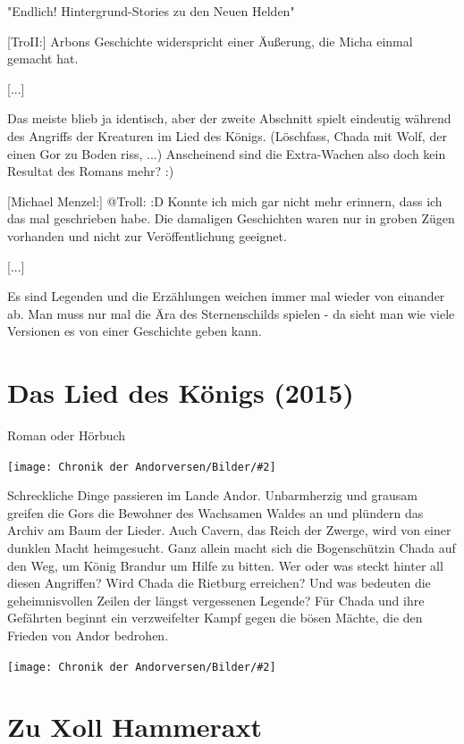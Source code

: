 \documentclass[10pt, a4paper, oneside]{book}
\newcommand{\fillbreak}{\vspace*{\fill}\columnbreak}
\newcommand{\produkt}[1]{%
    \section{#1}%
    \label{Produkt: #1}%
}
\newcommand{\bildmitts}[2][height=0.32\textwidth,width=0.48\textwidth,keepaspectratio]{%
    \begin{center}
        \texttt{[image: Chronik der Andorversen/Bilder/\#2]}
    \end{center}
}
\begin{document}
\begin{multicols}{2}
\begin{center} 
    "Endlich! Hintergrund-Stories zu den Neuen Helden"
\end{center}

[TroII:] Arbons Geschichte widerspricht einer Äußerung, die Micha einmal gemacht hat. 

[...]

Das meiste blieb ja identisch, aber der zweite Abschnitt spielt eindeutig während des Angriffs der Kreaturen im Lied des Königs. (Löschfass, Chada mit Wolf, der einen Gor zu Boden riss, ...) Anscheinend sind die Extra-Wachen also doch kein Resultat des Romans mehr? :)

[Michael Menzel:] @Troll: :D Konnte ich mich gar nicht mehr erinnern, dass ich das mal geschrieben habe. Die damaligen Geschichten waren nur in groben Zügen vorhanden und nicht zur Veröffentlichung geeignet.

[...]

Es sind Legenden und die Erzählungen weichen immer mal wieder von einander ab. Man muss nur mal die Ära des Sternenschilds spielen - da sieht man wie viele Versionen es von einer Geschichte geben kann.


\fillbreak
\produkt{Das Lied des Königs (2015)}

\begin{center}
    Roman oder Hörbuch
\end{center}

\bildmitts{Das Lied des Königs (2015).png}

Schreckliche Dinge passieren im Lande Andor. Unbarmherzig und grausam greifen die Gors die Bewohner des Wachsamen Waldes an und plündern das Archiv am Baum der Lieder. Auch Cavern, das Reich der Zwerge, wird von einer dunklen Macht heimgesucht. Ganz allein macht sich die Bogenschützin Chada auf den Weg, um König Brandur um Hilfe zu bitten. Wer oder was steckt hinter all diesen Angriffen? Wird Chada die Rietburg erreichen? Und was bedeuten die geheimnisvollen Zeilen der längst vergessenen Legende? Für Chada und ihre Gefährten beginnt ein verzweifelter Kampf gegen die bösen Mächte, die den Frieden von Andor bedrohen.

\bildmitts{Das Lied des Königs Chada Lonas.jpg}





\fillbreak
\section{Zu Xoll Hammeraxt}


\end{multicols}
\end{document}
